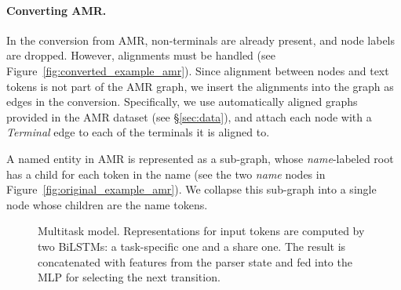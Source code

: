 \documentclass[11pt,a4paper]{article}
\begin{document}
\paragraph{Converting AMR.}
In the conversion from AMR, non-terminals are already present, and node labels are dropped.
However, alignments must be handled (see Figure~\ref{fig:converted_example_amr}).
Since alignment between nodes and text tokens is not part of the AMR graph,
we insert the alignments into the graph as edges in the conversion.
Specifically, we use automatically aligned graphs provided in the AMR dataset (see \S\ref{sec:data}),
and attach each node with a \textit{Terminal} edge to each of the terminals it is aligned to.
%

A named entity in AMR is represented as a sub-graph, whose \textit{name}-labeled root
has a child for each token in the name
(see the two \textit{name} nodes in Figure~\ref{fig:original_example_amr}).
We collapse this sub-graph into a single node whose children are the name tokens.


\begin{figure}[t]
   \caption{Multitask model.
      Representations for input tokens are computed by two BiLSTMs:
      a task-specific one and a share one. The result is concatenated with
      features from the parser state and fed into the MLP for selecting the next transition.}
   \label{fig:multi_model}
\end{figure}
\end{document}
